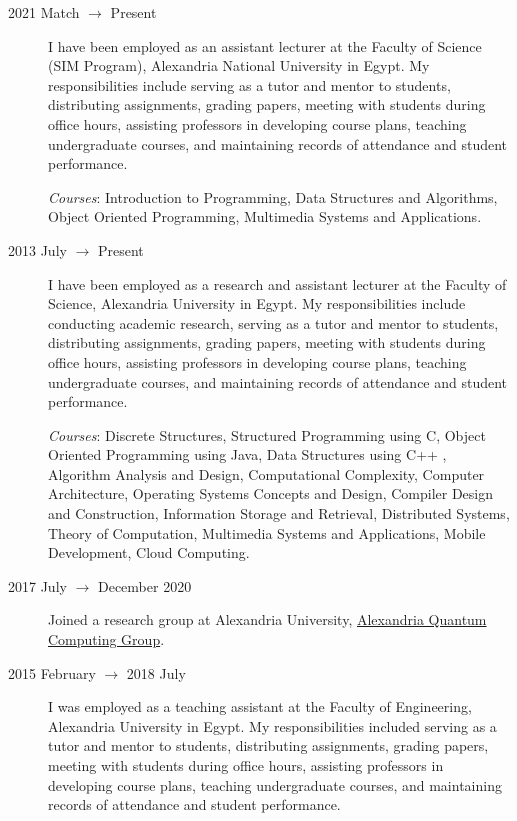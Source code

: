 \documentclass[margin,line]{resume}
\begin{document}
\begin{resume}
\begin{description}
		\item[2021 Match $\rightarrow$ Present] I have been employed as an assistant lecturer at the Faculty of Science (SIM Program), Alexandria National University in Egypt. My responsibilities include serving as a tutor and mentor to students, distributing assignments, grading papers, meeting with students during office hours, assisting professors in developing course plans, teaching undergraduate courses, and maintaining records of attendance and student performance.

			\emph{Courses}: Introduction to Programming, Data Structures and Algorithms, Object Oriented Programming, Multimedia Systems and Applications.

		\item[2013 July $\rightarrow$ Present]  I have been employed as a research and assistant lecturer at the Faculty of Science, Alexandria University in Egypt. My responsibilities include conducting academic research, serving as a tutor and mentor to students, distributing assignments, grading papers, meeting with students during office hours, assisting professors in developing course plans, teaching undergraduate courses, and maintaining records of attendance and student performance.

			\emph{Courses}: Discrete Structures, Structured Programming using C, Object Oriented Programming using Java, Data Structures using C++ , Algorithm Analysis and Design, Computational Complexity, Computer Architecture, Operating Systems Concepts and Design, Compiler Design and Construction, Information Storage and Retrieval, Distributed Systems, Theory of Computation, Multimedia Systems and Applications, Mobile Development, Cloud Computing.


		\item[2017 July $\rightarrow$ December 2020 ]  Joined a research group at Alexandria University, \href{http://www.sci.p.alexu.edu.eg/~aleqcg/index.html}{Alexandria Quantum Computing Group}.




		\item[2015 February $\rightarrow$ 2018 July]  I was employed as a teaching assistant at the Faculty of Engineering, Alexandria University in Egypt. My responsibilities included serving as a tutor and mentor to students, distributing assignments, grading papers, meeting with students during office hours, assisting professors in developing course plans, teaching undergraduate courses, and maintaining records of attendance and student performance.


\end{description}
\end{resume}
\end{document}
